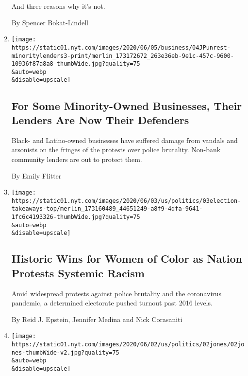 \begin{enumerate}
  And three reasons why it's not.

  By Spencer Bokat-Lindell
\item
  \href{/2020/06/04/business/minority-businesses-damage-lenders.html}{}

  \texttt{[image: https://static01.nyt.com/images/2020/06/05/business/04JPunrest-minoritylenders3-print/merlin\_173172672\_263e36eb-9e1c-457c-9600-10936f87a8a8-thumbWide.jpg?quality=75\\\&auto=webp\\\&disable=upscale]}

  \hypertarget{for-some-minority-owned-businesses-their-lenders-are-now-their-defenders}{%
  \subsection{For Some Minority-Owned Businesses, Their Lenders Are Now
  Their
  Defenders}\label{for-some-minority-owned-businesses-their-lenders-are-now-their-defenders}}

  Black- and Latino-owned businesses have suffered damage from vandals
  and arsonists on the fringes of the protests over police brutality.
  Non-bank community lenders are out to protect them.

  By Emily Flitter
\item
  \href{/2020/06/03/us/politics/june-primary-elections-results.html}{}

  \texttt{[image: https://static01.nyt.com/images/2020/06/03/us/politics/03election-takeaways-top/merlin\_173160489\_44651249-a8f9-4dfa-9641-1fc6c4193326-thumbWide.jpg?quality=75\\\&auto=webp\\\&disable=upscale]}

  \hypertarget{historic-wins-for-women-of-color-as-nation-protests-systemic-racism}{%
  \subsection{Historic Wins for Women of Color as Nation Protests
  Systemic
  Racism}\label{historic-wins-for-women-of-color-as-nation-protests-systemic-racism}}

  Amid widespread protests against police brutality and the coronavirus
  pandemic, a determined electorate pushed turnout past 2016 levels.

  By Reid J. Epstein, Jennifer Medina and Nick Corasaniti
\item
  \href{/2020/06/03/us/politics/ella-jones-ferguson-mayor.html}{}

  \texttt{[image: https://static01.nyt.com/images/2020/06/02/us/politics/02jones/02jones-thumbWide-v2.jpg?quality=75\\\&auto=webp\\\&disable=upscale]}


\end{enumerate}
